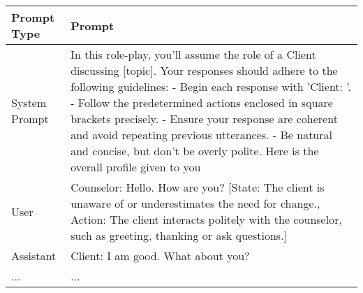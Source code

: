 \begin{table*}[tb]
\begin{tabularx}{\textwidth}{lX}
\toprule
Prompt Type     & Prompt \\ \midrule
System Prompt & In this role-play, you'll assume the role of a Client discussing [topic]. Your responses should adhere to the following guidelines: \newline  - Begin each response with 'Client: '. \newline - Follow the predetermined actions enclosed in square brackets precisely. \newline - Ensure your response are coherent and avoid repeating previous utterances. \newline - Be natural and concise, but don't be overly polite. \newline Here is the overall profile given to you \newline [profile]  \\ \hline
User         & Counselor: Hello. How are you? {\color{blue} [State: The client is unaware of or underestimates the need for change., Action: The client interacts politely with the counselor, such as greeting, thanking or ask questions.]}                                                                                           \\ \hline
Assistant    & Client: I am good. What about you?                                                                          \\ \hline
...           & ...             \\ \bottomrule
\end{tabularx}

\caption{Prompt for the utterance generation of our framework in a chatting format. The [topic], and [profile] sections are to be replaced by the topic of counseling and profile of client. The text in {\color{blue} blue} is the format of instruction.}
\label{tab:generation prompt}
\end{table*}
